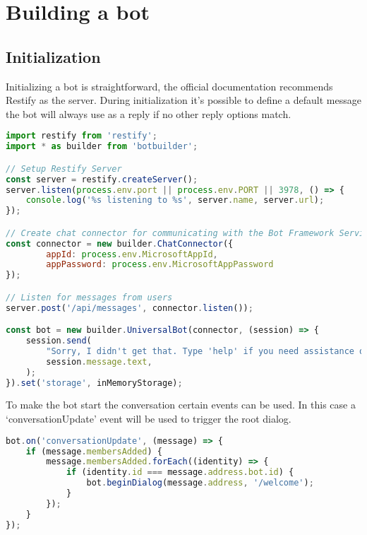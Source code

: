 \section{Building a bot}

\subsection{Initialization}

Initializing a bot is straightforward, the official documentation recommends Restify\cite{restify} as the server. During initialization it's possible to define a default message the bot will always use as a reply if no other reply options match.

\newpage

\begin{lstlisting}[language=JavaScript,caption=Initialization of a chatbot,label=listing:botframework-init]
import restify from 'restify';
import * as builder from 'botbuilder';

// Setup Restify Server
const server = restify.createServer();
server.listen(process.env.port || process.env.PORT || 3978, () => {
	console.log('%s listening to %s', server.name, server.url); 
});

// Create chat connector for communicating with the Bot Framework Service
const connector = new builder.ChatConnector({
		appId: process.env.MicrosoftAppId,
		appPassword: process.env.MicrosoftAppPassword
});

// Listen for messages from users 
server.post('/api/messages', connector.listen());

const bot = new builder.UniversalBot(connector, (session) => {
	session.send(
		"Sorry, I didn't get that. Type 'help' if you need assistance or try a different sentence.",
		session.message.text,
	);
}).set('storage', inMemoryStorage);
\end{lstlisting}

\newpage

To make the bot start the conversation certain events can be used. In this case a `conversationUpdate' event will be used to trigger the root dialog.

\begin{lstlisting}[language=JavaScript,caption=The root event of a bot,label=listing:botframework-init-message]
bot.on('conversationUpdate', (message) => {
	if (message.membersAdded) {
		message.membersAdded.forEach((identity) => {
			if (identity.id === message.address.bot.id) {
				bot.beginDialog(message.address, '/welcome');
			}
		});
	}
});
\end{lstlisting}


